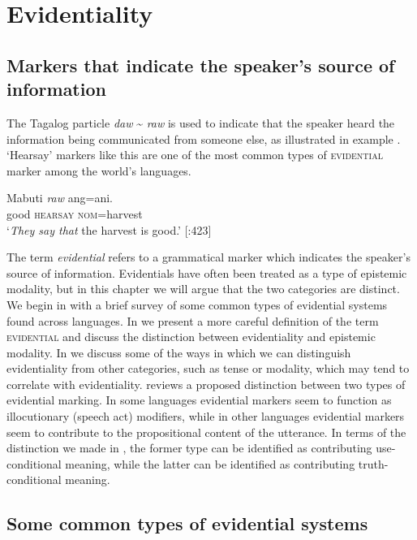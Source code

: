 \chapter{Evidentiality}\label{sec:17}

\section{Markers that indicate the speaker’s source of information}\label{sec:17.1}

The Tagalog particle \textit{daw} {\textasciitilde} \textit{raw} is used to indicate that the speaker heard the information being communicated from someone else, as illustrated in example . ‘Hearsay’ markers like this are one of the most common types of \textsc{evidential} marker among the world’s languages.


\ea
\gll Mabuti  \textit{raw}  ang=ani.\\
good  \textsc{hearsay}  \textsc{nom}=harvest\\
\glt ‘\textit{They say that} the harvest is good.’   [\citealt{SchachterOtanes1972}:423]
\z


The term \textit{evidential} refers to a grammatical marker which indicates the speaker’s source of information. Evidentials have often been treated as a type of epistemic modality, but in this chapter we will argue that the two categories are distinct. We begin in  with a brief survey of some common types of evidential systems found across languages. In  we present a more careful definition of the term \textsc{evidential} and discuss the distinction between evidentiality and epistemic modality. In  we discuss some of the ways in which we can distinguish evidentiality from other categories, such as tense or modality, which may tend to correlate with evidentiality.  reviews a proposed distinction between two types of evidential marking. In some languages evidential markers seem to function as illocutionary (speech act) modifiers, while in other languages evidential markers seem to contribute to the propositional content of the utterance. In terms of the distinction we made in , the former type can be identified as contributing use-conditional meaning, while the latter can be identified as contributing truth-conditional meaning.


\section{Some common types of evidential systems}\label{sec:17.2}

